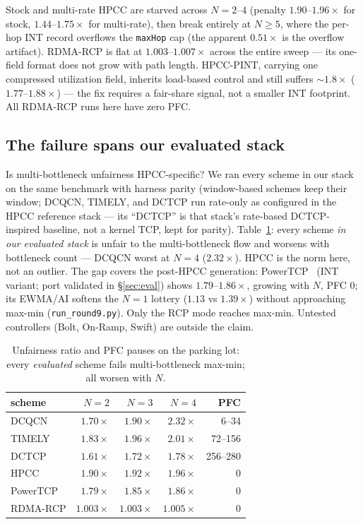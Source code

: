 \documentclass[conference]{IEEEtran}
\newcommand{\hpccfs}{\textsc{RDMA-RCP}\xspace}
\begin{document}
Stock and multi-rate HPCC are starved across $N = 2$--$4$ (penalty $1.90$--$1.96\times$ for stock,
$1.44$--$1.75\times$ for multi-rate), then break entirely at $N \ge 5$, where the per-hop INT
record overflows the \texttt{maxHop} cap (the apparent $0.51\times$ is the overflow
artifact). \hpccfs is flat at $1.003$--$1.007\times$ across the entire sweep --- its one-field format
does not grow with path length. HPCC-PINT, carrying one compressed utilization field, inherits load-based control and still
suffers ${\sim}1.8\times$ ($1.77$--$1.88\times$) --- the fix requires a fair-share signal,
not a smaller INT footprint. All \hpccfs runs here have zero PFC.

\subsection{The failure spans our evaluated stack}
\label{sec:endemic}

Is multi-bottleneck unfairness HPCC-specific? We ran every scheme in our stack on the same
benchmark with harness parity (window-based schemes keep their window; DCQCN, TIMELY, and
DCTCP run rate-only as configured in the HPCC reference stack --- its ``DCTCP'' is that
stack's rate-based DCTCP-inspired baseline, not a kernel TCP, kept for parity). Table~\ref{tab:endemic}: every scheme \emph{in our evaluated stack} is unfair to the
multi-bottleneck flow and worsens with bottleneck count --- DCQCN worst at $N{=}4$
($2.32\times$). HPCC is the norm here, not an outlier. The gap covers the post-HPCC generation:
PowerTCP~\cite{addanki2022powertcp} (INT variant; port validated in \S\ref{sec:eval})
shows $1.79$--$1.86\times$, growing with $N$, PFC 0; its EWMA/AI softens the $N{=}1$
lottery ($1.13$ vs $1.39\times$) without approaching max-min (\texttt{run\_round9.py}). Only the RCP mode reaches max-min. Untested controllers (Bolt,
On-Ramp, Swift) are outside the claim.

\begin{table}[t]
\caption{Unfairness ratio and PFC pauses on the parking lot: every \emph{evaluated} scheme
fails multi-bottleneck max-min; all worsen with $N$.}
\label{tab:endemic}
\centering\small
\begin{tabular}{lrrrr}
\toprule
scheme & $N{=}2$ & $N{=}3$ & $N{=}4$ & PFC \\
\midrule
DCQCN & $1.70\times$ & $1.90\times$ & $2.32\times$ & 6--34 \\
TIMELY & $1.83\times$ & $1.96\times$ & $2.01\times$ & 72--156 \\
DCTCP & $1.61\times$ & $1.72\times$ & $1.78\times$ & 256--280 \\
HPCC & $1.90\times$ & $1.92\times$ & $1.96\times$ & 0 \\
PowerTCP & $1.79\times$ & $1.85\times$ & $1.86\times$ & 0 \\
\hpccfs & $\mathbf{1.003\times}$ & $\mathbf{1.003\times}$ & $\mathbf{1.005\times}$ & 0 \\
\bottomrule
\end{tabular}
\end{table}
\end{document}
